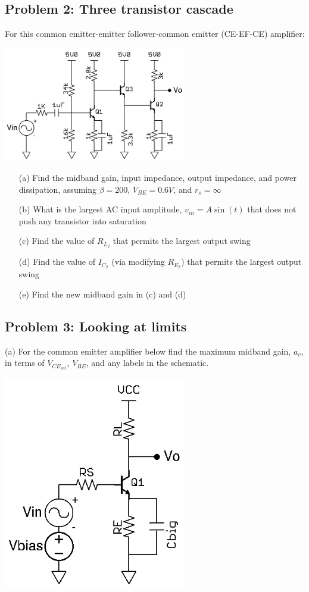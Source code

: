 \documentclass[11pt,twoside]{article}
\begin{document}
\subsection*{Problem 2: Three transistor cascade}
	For this common emitter-emitter follower-common emitter (CE-EF-CE) amplifier:
\begin{center}
\includegraphics[width=0.6\textwidth]{ce-ef-ce.png}
\end{center}
\begin{enumerate}
	\item[(a)] Find the midband gain, input impedance, output impedance, and power dissipation, assuming $\beta=200$, $V_{BE}=0.6V$, and $r_o=\infty$
	\item[(b)] What is the largest AC input amplitude, $v_{in}=A\sin(t)$ that does not push any transistor into saturation
	\item[(c)] Find the value of $R_{L_2}$ that permits the largest output swing
	\item[(d)] Find the value of $I_{C_2}$ (via modifying $R_{E_2}$) that permits the largest output swing
	\item[(e)] Find the new midband gain in (c) and (d)
\end{enumerate}

\subsection*{Problem 3: Looking at limits}
	\item[(a)] For the common emitter amplifier below find the maximum midband gain, $a_v$, in terms of $V_{CE_{sat}}$, $V_{BE}$, and any labels in the schematic. 

\begin{center}
\includegraphics[width=0.6\textwidth]{ce-max.png}
\end{center}
\end{document}
